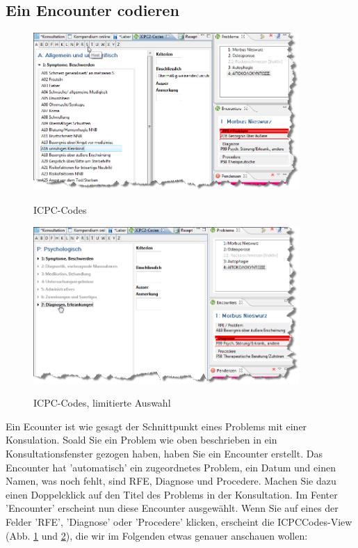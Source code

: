 \documentclass[a4paper]{scrartcl}
\begin{document}
\subsection{Ein Encounter codieren}
\begin{figure}
  \includegraphics[width=0.9\textwidth]{icpc3}\\
  \caption{ICPC-Codes}\label{fig:icpc4}
\end{figure}
\begin{figure}
  \includegraphics[width=0.9\textwidth]{icpc4}\\
  \caption{ICPC-Codes, limitierte Auswahl}\label{fig:icpc5}
\end{figure}


Ein Ecounter ist wie gesagt der Schnittpunkt eines Problems mit einer Konsulation. Soald Sie ein Problem wie oben beschrieben in ein Konsultationsfenster gezogen haben, haben Sie ein Encounter erstellt. Das Encounter hat 'automatisch' ein zugeordnetes Problem, ein Datum und einen Namen, was noch fehlt, sind RFE, Diagnose und Procedere. Machen Sie dazu einen Doppelcklick auf den Titel des Problems in der Konsultation. Im Fenter 'Encounter' erscheint nun diese Encounter ausgewählt. Wenn Sie auf eines der Felder 'RFE', 'Diagnose' oder 'Procedere' klicken, erscheint die ICPCCodes-View (Abb. \ref{fig:icpc4} und \ref{fig:icpc5}), die wir im Folgenden etwas genauer anschauen wollen:
\end{document}
